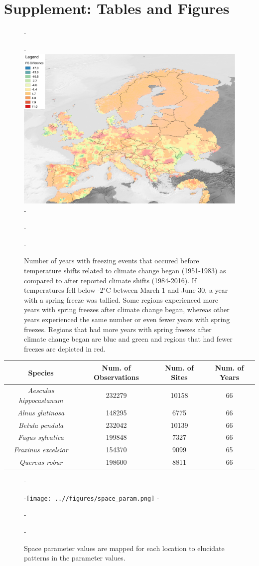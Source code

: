 \documentclass{article}\usepackage[]{graphicx}\usepackage[]{color}
\begin{document}
\section*{Supplement: Tables and Figures}
{\begin{figure} [H]
  -\begin{center}
  -\includegraphics[width=12cm]{..//figures/FS_Diff.pdf}
  -\caption{Number of years with freezing events that occured before temperature shifts related to climate change began (1951-1983) as compared to after reported climate shifts (1984-2016). If temperatures fell below -2$^{\circ}$C between March 1 and June 30, a year with a spring freeze was tallied. Some regions experienced more years with spring freezes after climate change began, whereas other years experienced the same number or even fewer years with spring freezes. Regions that had more years with spring freezes after climate change began are blue and green and regions that had fewer freezes are depicted in red.}\label{fig:region}
  -\end{center}
  -\end{figure}}
  
\begin{center}
 \label{tab:spp} 
\begin{tabular}{c c c c}
\hline
\textbf{Species} & \textbf{Num. of Observations} & \textbf{Num. of Sites} & \textbf{Num. of Years} \\
\hline
\textit{Aesculus hippocastanum} & 232279 & 10158 & 66  \\
\hline
\textit{Alnus glutinosa} & 148295 & 6775 & 66 \\
\hline
\textit{Betula pendula} & 232042 & 10139 & 66 \\
\hline
\textit{Fagus sylvatica} & 199848 & 7327 & 66 \\
\hline
\textit{Fraxinus excelsior} & 154370 & 9099 & 65 \\
\hline
\textit{Quercus robur} & 198600  & 8811 & 66 \\
\end{tabular}
\end{center}
  
{\begin{figure} [H]
  -\begin{center}
  -\texttt{[image: ..//figures/space\_param.png]}
  -\caption{Space parameter values are mapped for each location to elucidate patterns in the parameter values.}\label{fig:space}
  -\end{center}
  -\end{figure}}
  
\end{document}
